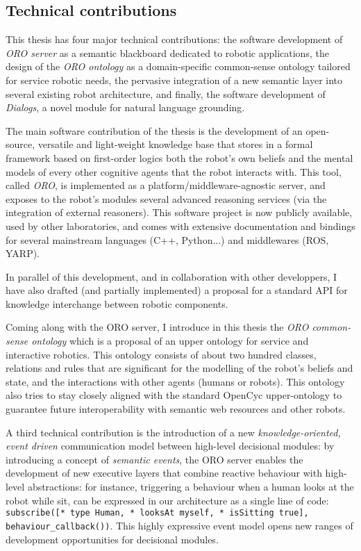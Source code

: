 \subsection{Technical contributions}
\label{sect|technical-contributions}


This thesis has four major technical contributions: the software development of
\emph{ORO server} as a semantic blackboard dedicated to robotic applications,
the design of the \emph{ORO ontology} as a domain-specific common-sense
ontology tailored for service robotic needs, the pervasive integration of a new
semantic layer into several existing robot architecture, and finally, the
software development of \emph{Dialogs}, a novel module for natural language
grounding.

The main software contribution of the thesis is the development of an
open-source, versatile and light-weight knowledge base that stores in a
formal framework based on first-order logics both the robot's own beliefs and
the mental models of every other cognitive agents that the robot interacts
with. This tool, called \emph{ORO}, is implemented as a
platform/middleware-agnostic server, and exposes to the robot's modules
several advanced reasoning services (via the integration of external
reasoners). This software project is now publicly available, used by other
laboratories, and comes with extensive documentation and bindings for several
mainstream languages (C++, Python...) and middlewares (ROS, YARP).

In parallel of this development, and in collaboration with other developpers,
I have also drafted (and partially implemented) a proposal for a standard API
for knowledge interchange between robotic components.

Coming along with the ORO server, I introduce in this thesis the
\emph{ORO common-sense ontology} which is a proposal of an upper ontology for
service and interactive robotics. This ontology consists of about two hundred
classes, relations and rules that are significant for the modelling of the
robot's beliefs and state, and the interactions with other agents (humans or
robots). This ontology also tries to stay closely aligned with the standard
{\sc OpenCyc} upper-ontology to guarantee future interoperability with semantic
web resources and other robots.

A third technical contribution is the introduction of a new
\emph{knowledge-oriented, event driven} communication model between high-level
decisional modules: by introducing a concept of \emph{semantic events}, the ORO
server enables the development of new executive layers that combine reactive
behaviour with high-level abstractions: for instance, triggering a behaviour
when a human looks at the robot while sit, can be expressed in our architecture
as a single line of code: {\tt subscribe([* type Human, * looksAt myself, *
isSitting true], behaviour\_callback())}. This highly expressive event model
opens new ranges of development opportunities for decisional modules.

